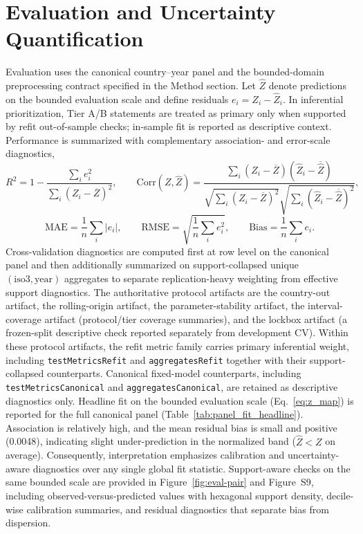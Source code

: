 \documentclass[11pt]{article}
\begin{document}
\section{Evaluation and Uncertainty Quantification}
Evaluation uses the canonical country--year panel and the bounded-domain preprocessing contract specified in the Method section. Let $\widehat{Z}$ denote predictions on the bounded evaluation scale and define residuals $e_i=Z_i-\widehat{Z}_i$. In inferential prioritization, Tier A/B statements are treated as primary only when supported by refit out-of-sample checks; in-sample fit is reported as descriptive context. Performance is summarized with complementary association- and error-scale diagnostics,
\begin{equation}
\label{eq:eval_metrics_r2_corr}
R^2 = 1-\frac{\sum_i e_i^2}{\sum_i (Z_i-\overline{Z})^2},\qquad
\mathrm{Corr}(Z,\widehat{Z})=\frac{\sum_i (Z_i-\overline{Z})(\widehat{Z}_i-\overline{\widehat{Z}})}
{\sqrt{\sum_i (Z_i-\overline{Z})^2}\sqrt{\sum_i (\widehat{Z}_i-\overline{\widehat{Z}})^2}},
\end{equation}
\begin{equation}
\label{eq:eval_metrics_errors}
\mathrm{MAE}=\frac{1}{n}\sum_i |e_i|,\qquad
\mathrm{RMSE}=\sqrt{\frac{1}{n}\sum_i e_i^2},\qquad
\mathrm{Bias}=\frac{1}{n}\sum_i e_i.
\end{equation}
Cross-validation diagnostics are computed first at row level on the canonical panel and then additionally summarized on support-collapsed unique $(\mathrm{iso3},\mathrm{year})$ aggregates to separate replication-heavy weighting from effective support diagnostics. The authoritative protocol artifacts are the country-out artifact, the rolling-origin artifact, the parameter-stability artifact, the interval-coverage artifact (protocol/tier coverage summaries), and the lockbox artifact (a frozen-split descriptive check reported separately from development CV).
Within these protocol artifacts, the refit metric family carries primary inferential weight, including \texttt{testMetricsRefit} and \texttt{aggregatesRefit} together with their support-collapsed counterparts. Canonical fixed-model counterparts, including \texttt{testMetricsCanonical} and \texttt{aggregatesCanonical}, are retained as descriptive diagnostics only.
Headline fit on the bounded evaluation scale (Eq.~\eqref{eq:z_map}) is reported for the full canonical panel (Table~\ref{tab:panel_fit_headline}). Association is relatively high, and the mean residual bias is small and positive (\num{0.0048}), indicating slight under-prediction in the normalized band ($\widehat{Z}<Z$ on average). Consequently, interpretation emphasizes calibration and uncertainty-aware diagnostics over any single global fit statistic. Support-aware checks on the same bounded scale are provided in Figure~\ref{fig:eval-pair} and Figure~S9, including observed-versus-predicted values with hexagonal support density, decile-wise calibration summaries, and residual diagnostics that separate bias from dispersion.
\end{document}
